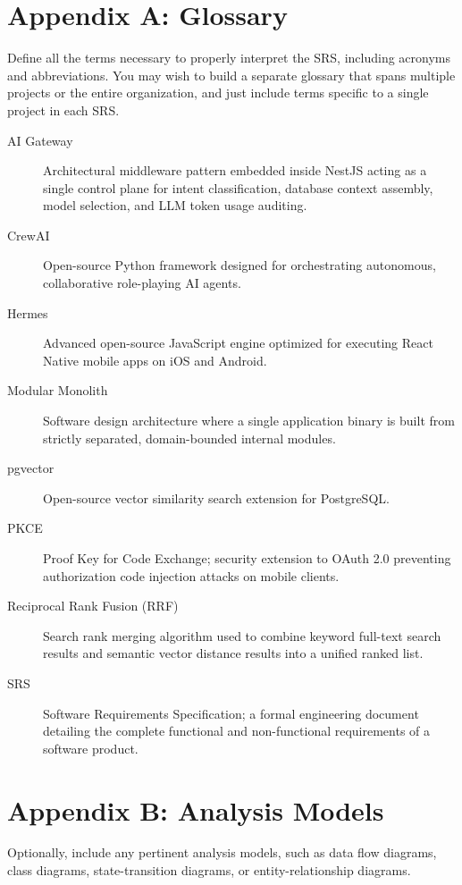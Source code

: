 \documentclass[11pt,a4paper]{article}
\begin{document}
\newpage
\section*{Appendix A: Glossary}
Define all the terms necessary to properly interpret the SRS, including acronyms and abbreviations. You may wish to build a separate glossary that spans multiple projects or the entire organization, and just include terms specific to a single project in each SRS.

\begin{description}
    \item[AI Gateway] Architectural middleware pattern embedded inside NestJS acting as a single control plane for intent classification, database context assembly, model selection, and LLM token usage auditing.
    \item[CrewAI] Open-source Python framework designed for orchestrating autonomous, collaborative role-playing AI agents.
    \item[Hermes] Advanced open-source JavaScript engine optimized for executing React Native mobile apps on iOS and Android.
    \item[Modular Monolith] Software design architecture where a single application binary is built from strictly separated, domain-bounded internal modules.
    \item[pgvector] Open-source vector similarity search extension for PostgreSQL.
    \item[PKCE] Proof Key for Code Exchange; security extension to OAuth 2.0 preventing authorization code injection attacks on mobile clients.
    \item[Reciprocal Rank Fusion (RRF)] Search rank merging algorithm used to combine keyword full-text search results and semantic vector distance results into a unified ranked list.
    \item[SRS] Software Requirements Specification; a formal engineering document detailing the complete functional and non-functional requirements of a software product.
\end{description}

\vspace{0.1cm}

\section*{Appendix B: Analysis Models}
Optionally, include any pertinent analysis models, such as data flow diagrams, class diagrams, state-transition diagrams, or entity-relationship diagrams.
\end{document}
